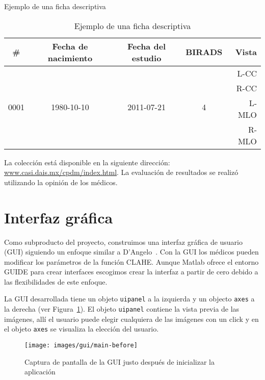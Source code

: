 \begin{table}
    \caption{Ejemplo de una ficha descriptiva}{Ejemplo de una ficha descriptiva}
  \label{samplecard}
\begin{center}
{\small
    \begin{tabular}{c|c|c|c|r}
    \hline

    {\bf \phantom{i}\# } &
    {\bf Fecha de nacimiento} &
    {\bf Fecha del estudio} &
    {\bf BIRADS} &
    {\bf Vista} \\
    \hline
        \multirow{4}{*}{0001} &
        \multirow{4}{*}{1980-10-10} &
        \multirow{4}{*}{2011-07-21} &
        \multirow{4}{*}{4} &
                            L-CC \\
            &   &   &   &   R-CC \\
            &   &   &   &   L-MLO \\
            &   &   &   &   R-MLO \\
    \hline
    \end{tabular}
}
\end{center}
\end{table}

La colección está disponible en la siguiente dirección:
\url{www.casi.dais.mx/cpdm/index.html}. La evaluación de resultados se realizó
utilizando la opinión de los médicos.

\shorthandoff{>} %
    
\shorthandon{>}

\section{Interfaz gráfica}

Como subproducto del proyecto, construimos una interfaz gráfica de usuario
(GUI) siguiendo un enfoque similar a D'Angelo~\cite{d2007design}. Con la GUI
los médicos pueden modificar los parámetros de la función CLAHE. Aunque Matlab
ofrece el entorno GUIDE para crear interfaces escogimos crear la interfaz a
partir de cero debido a las flexibilidades de este enfoque.

La GUI desarrollada tiene un objeto \texttt{uipanel} a la izquierda y un
objecto \texttt{axes} a la derecha (ver Figura~\ref{main:before}). El objeto
\texttt{uipanel} contiene la vista previa de las imágenes, allí el usuario
puede elegir cualquiera de las imágenes con un click y en el objeto
\texttt{axes} se visualiza la elección del usuario.

\begin{figure}[h]
  \begin{center}
    {\texttt{[image: images/gui/main-before]}}
  \end{center}
  \caption[GUI: Inicio]{Captura de pantalla de la GUI justo después de inicializar la aplicación}
  \label{main:before}
\end{figure}

